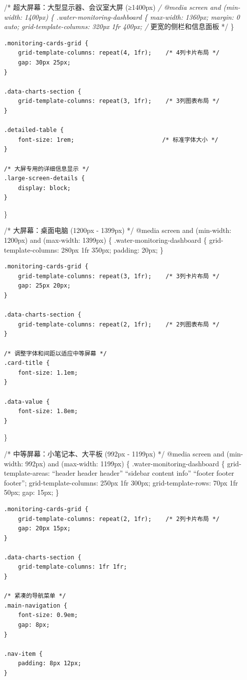 /* 超大屏幕：大型显示器、会议室大屏 (≥1400px) \emph{/ @media screen and (min-width: 1400px) \{ .water-monitoring-dashboard \{ max-width: 1360px; margin: 0 auto; grid-template-columns: 320px 1fr 400px; /} 更宽的侧栏和信息面板 */ \}

\begin{verbatim}
.monitoring-cards-grid {
    grid-template-columns: repeat(4, 1fr);    /* 4列卡片布局 */
    gap: 30px 25px;
}

.data-charts-section {
    grid-template-columns: repeat(3, 1fr);    /* 3列图表布局 */
}

.detailed-table {
    font-size: 1rem;                         /* 标准字体大小 */
}

/* 大屏专用的详细信息显示 */
.large-screen-details {
    display: block;
}
\end{verbatim}

\}

/* 大屏幕：桌面电脑 (1200px - 1399px) */ @media screen and (min-width: 1200px) and (max-width: 1399px) \{ .water-monitoring-dashboard \{ grid-template-columns: 280px 1fr 350px; padding: 20px; \}

\begin{verbatim}
.monitoring-cards-grid {
    grid-template-columns: repeat(3, 1fr);    /* 3列卡片布局 */
    gap: 25px 20px;
}

.data-charts-section {
    grid-template-columns: repeat(2, 1fr);    /* 2列图表布局 */
}

/* 调整字体和间距以适应中等屏幕 */
.card-title {
    font-size: 1.1em;
}

.data-value {
    font-size: 1.8em;
}
\end{verbatim}

\}

/* 中等屏幕：小笔记本、大平板 (992px - 1199px) */ @media screen and (min-width: 992px) and (max-width: 1199px) \{ .water-monitoring-dashboard \{ grid-template-areas: ``header header header'' ``sidebar content info'' ``footer footer footer''; grid-template-columns: 250px 1fr 300px; grid-template-rows: 70px 1fr 50px; gap: 15px; \}

\begin{verbatim}
.monitoring-cards-grid {
    grid-template-columns: repeat(2, 1fr);    /* 2列卡片布局 */
    gap: 20px 15px;
}

.data-charts-section {
    grid-template-columns: 1fr 1fr;
}

/* 紧凑的导航菜单 */
.main-navigation {
    font-size: 0.9em;
    gap: 8px;
}

.nav-item {
    padding: 8px 12px;
}
\end{verbatim}

